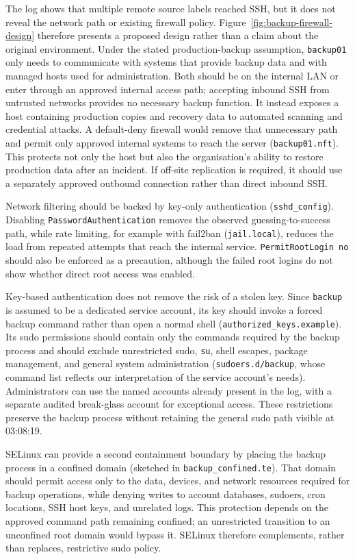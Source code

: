 The log shows that multiple remote source labels reached SSH, but it does not reveal the network path or existing firewall policy. Figure~\ref{fig:backup-firewall-design} therefore presents a proposed design rather than a claim about the original environment. Under the stated production-backup assumption, \texttt{backup01} only needs to communicate with systems that provide backup data and with managed hosts used for administration. Both should be on the internal LAN or enter through an approved internal access path; accepting inbound SSH from untrusted networks provides no necessary backup function. It instead exposes a host containing production copies and recovery data to automated scanning and credential attacks. A default-deny firewall would remove that unnecessary path and permit only approved internal systems to reach the server (\texttt{backup01.nft}). This protects not only the host but also the organisation's ability to restore production data after an incident. If off-site replication is required, it should use a separately approved outbound connection rather than direct inbound SSH.

Network filtering should be backed by key-only authentication (\texttt{sshd\_config}). Disabling \texttt{PasswordAuthentication} removes the observed guessing-to-success path, while rate limiting, for example with fail2ban (\texttt{jail.local}), reduces the load from repeated attempts that reach the internal service. \texttt{PermitRootLogin no} should also be enforced as a precaution, although the failed root logins do not show whether direct root access was enabled.

Key-based authentication does not remove the risk of a stolen key. Since \texttt{backup} is assumed to be a dedicated service account, its key should invoke a forced backup command rather than open a normal shell (\texttt{authorized\_keys.example}). Its sudo permissions should contain only the commands required by the backup process and should exclude unrestricted sudo, \texttt{su}, shell escapes, package management, and general system administration (\texttt{sudoers.d/backup}, whose command list reflects our interpretation of the service account's needs). Administrators can use the named accounts already present in the log, with a separate audited break-glass account for exceptional access. These restrictions preserve the backup process without retaining the general sudo path visible at 03:08:19.

SELinux can provide a second containment boundary by placing the backup process in a confined domain (sketched in \texttt{backup\_confined.te}). That domain should permit access only to the data, devices, and network resources required for backup operations, while denying writes to account databases, sudoers, cron locations, SSH host keys, and unrelated logs. This protection depends on the approved command path remaining confined; an unrestricted transition to an unconfined root domain would bypass it. SELinux therefore complements, rather than replaces, restrictive sudo policy.

